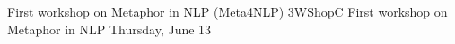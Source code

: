 \begin{wsschedule}
{First workshop on Metaphor in NLP (Meta4NLP)}
{3}{WShopC}
{First workshop on Metaphor in NLP}
{Thursday, June 13}{\WShopLocC}

\end{wsschedule}

